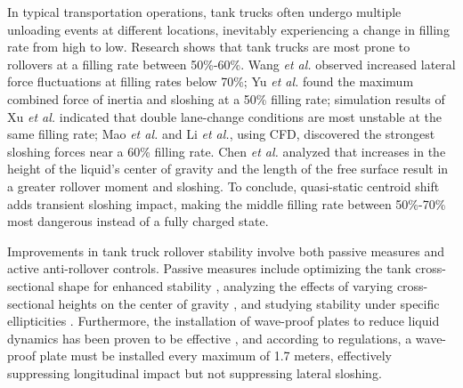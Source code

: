 In typical transportation operations, tank trucks often undergo multiple unloading events at different locations, inevitably experiencing a change in filling rate from high to low. Research shows that tank trucks are most prone to rollovers at a filling rate between 50\%-60\%. Wang \textit{et al.}\cite{WangXiaorun2022} observed increased lateral force fluctuations at filling rates below 70\%; Yu \textit{et al.}\cite{Yuzhixin2018} found the maximum combined force of inertia and sloshing at a 50\% filling rate; simulation results of Xu \textit{et al.}\cite{XuXiaomei2022} indicated that double lane-change conditions are most unstable at the same filling rate; Mao \textit{et al.}\cite{MaoHaijian2021} and Li \textit{et al.}\cite{Lijie2020}, using CFD, discovered the strongest sloshing forces near a 60\% filling rate. Chen \textit{et al.}\cite{ChenYibao2016} analyzed that increases in the height of the liquid's center of gravity and the length of the free surface result in a greater rollover moment and sloshing. To conclude, quasi-static centroid shift adds transient sloshing impact, making the middle filling rate between 50\%-70\% most dangerous instead of a fully charged state.


Improvements in tank truck rollover stability involve both passive measures and active anti-rollover controls. Passive measures include optimizing the tank cross-sectional shape for enhanced stability \cite{ChenYibao2016}, analyzing the effects of varying cross-sectional heights on the center of gravity \cite{Quhuijun2017}, and studying stability under specific ellipticities \cite{Yudi_Lixiansheng2016,Yudi2019}. Furthermore, the installation of wave-proof plates to reduce liquid dynamics has been proven to be effective \cite{Gonzalo2022,LiuKui_Kangning_brake,LiuKui_Kangning_corner}, and according to regulations, a wave-proof plate must be installed every maximum of 1.7 meters, effectively suppressing longitudinal impact but not suppressing lateral sloshing. 



